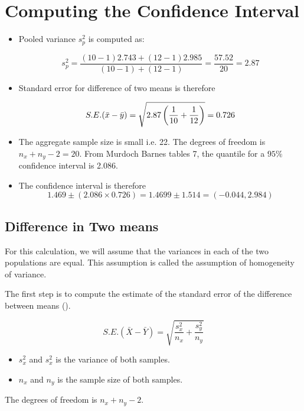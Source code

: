 \documentclass[]{report}
\begin{document}
	\section{Computing the Confidence Interval}
	\begin{itemize} \item Pooled variance $s^2_p$ is computed as:
		
		\[ s^2_p = \frac{(10-1)2.743 + (12-1)2.985}{(10-1) + (12-1)}  = \frac{57.52}{20} = 2.87\]
		
		\item Standard error for difference of two means is therefore
		
		\[ S.E.(\bar{x}-\bar{y}) = \sqrt{  2.87 \left({1\over 10}+{1\over 12} \right)} = 0.726 \]
		
		\item The aggregate sample size is small i.e. 22. The degrees of freedom is $n_x+n_y-2 = 20$.
		From Murdoch Barnes tables 7, the quantile for a $95\%$ confidence interval is 2.086.
		
		\item The confidence interval is therefore
		\[ 1.469  \pm (2.086 \times 0.726) = 1.4699 \pm 1.514 =  (-0.044, 2.984 )  \]
	\end{itemize}
	
	
	

	
	\subsection{Difference in Two means}
	For this calculation, we will assume that the variances in each of the two populations are equal. This assumption is called the assumption of homogeneity of variance.
	
	The first step is to compute the estimate of the standard error of the difference between means ().
	
	\[ S.E.(\bar{X}-\bar{Y}) = \sqrt{\frac{s^2_x}{n_x} + \frac{s^2_y}{n_y}} \]
	
	\begin{itemize}
		\item $s^2_x$ and $s^2_x$ is the variance of both samples.
		\item $n_x$ and $n_y$ is the sample size of both samples.
	\end{itemize}
	The degrees of freedom is $n_x + n_y -2$.
	
	
	
	
\end{document}
